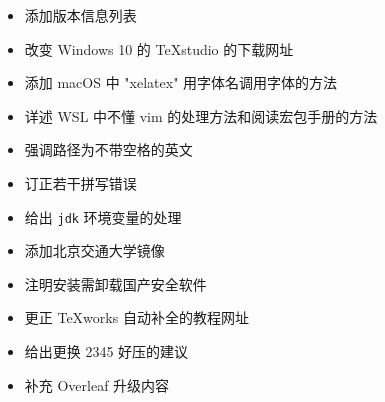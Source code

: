 \begin{itemize}
    \item 添加版本信息列表
    \item 改变 Windows 10 的 \TeX studio 的下载网址
    \item 添加 macOS 中 "xelatex" 用字体名调用字体的方法
    \item 详述 WSL 中不懂 \textsf{vim} 的处理方法和阅读宏包手册的方法
    \item 强调路径为不带空格的英文
    \item 订正若干拼写错误
    \item 给出 \texttt{jdk} 环境变量的处理
    \item 添加北京交通大学镜像
    \item 注明安装需卸载国产安全软件
    \item 更正 \TeX works 自动补全的教程网址
    \item 给出更换 2345 好压的建议
    \item 补充 Overleaf 升级内容
\end{itemize}
